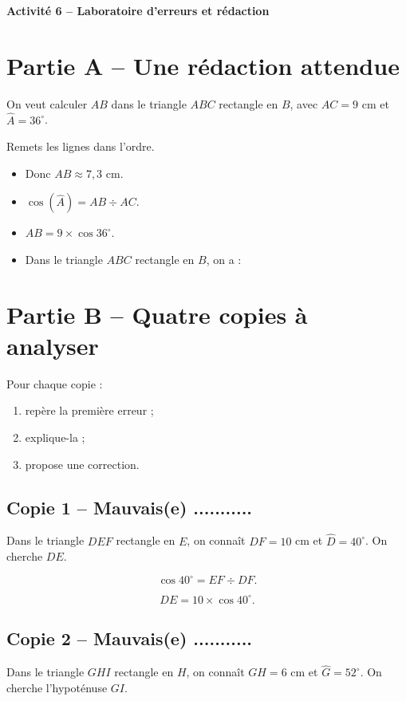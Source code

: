 \documentclass[12pt,a4paper]{article}
\newcommand{\titreseq}[1]{%
\begin{center}
{\sffamily\large\bfseries\color{SavoirC}#1}
\end{center}}
\begin{document}
\titreseq{Activité 6 -- Laboratoire d'erreurs et rédaction}

\section*{Partie A -- Une rédaction attendue}

On veut calculer \(AB\) dans le triangle \(ABC\) rectangle en \(B\),
avec \(AC=9\) cm et \(\widehat A=36^\circ\).

Remets les lignes dans l'ordre.

\begin{itemize}
  \item[\(\square\)] Donc \(AB\approx7{,}3\) cm.
  \item[\(\square\)] \(\cos(\widehat A)=AB\div AC\).
  \item[\(\square\)] \(AB=9\times\cos 36^\circ\).
  \item[\(\square\)] Dans le triangle \(ABC\) rectangle en \(B\), on a :
\end{itemize}

\section*{Partie B -- Quatre copies à analyser}

Pour chaque copie :

\begin{enumerate}
  \item repère la première erreur ;
  \item explique-la ;
  \item propose une correction.
\end{enumerate}

\subsection*{Copie 1 -- Mauvais(e) ...........}

Dans le triangle \(DEF\) rectangle en \(E\), on connaît
\(DF=10\) cm et \(\widehat D=40^\circ\).
On cherche \(DE\).

\[
\cos 40^\circ=EF\div DF.
\]

\[
DE=10\times\cos 40^\circ.
\]

\subsection*{Copie 2 -- Mauvais(e) ...........}

Dans le triangle \(GHI\) rectangle en \(H\), on connaît
\(GH=6\) cm et \(\widehat G=52^\circ\).
On cherche l'hypoténuse \(GI\).
\end{document}
